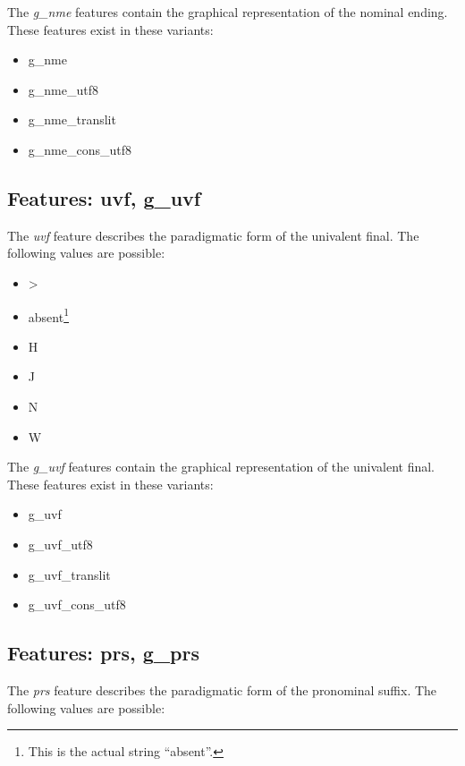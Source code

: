 \documentclass[11pt,oneside,a4paper]{memoir}
\begin{document}
The \emph{g\_nme} features contain the graphical representation of the nominal ending.
These features exist in these variants:

\begin{itemize}
\item g\_nme
\item g\_nme\_utf8
\item g\_nme\_translit
\item g\_nme\_cons\_utf8
\end{itemize}

\subsection{Features: uvf, g\_uvf}

The \emph{uvf} feature describes the paradigmatic form of the univalent final. The following
values are possible:

\begin{itemize}
\item >
\item absent\footnote{This is the actual string ``absent''.}
\item H
\item J
\item N
\item W
\end{itemize}

The \emph{g\_uvf} features contain the graphical representation of the univalent final.
These features exist in these variants:

\begin{itemize}
\item g\_uvf
\item g\_uvf\_utf8
\item g\_uvf\_translit
\item g\_uvf\_cons\_utf8
\end{itemize}


\subsection{Features: prs, g\_prs}\label{prs}

The \emph{prs} feature describes the paradigmatic form of the pronominal suffix. The following
values are possible:
\end{document}
